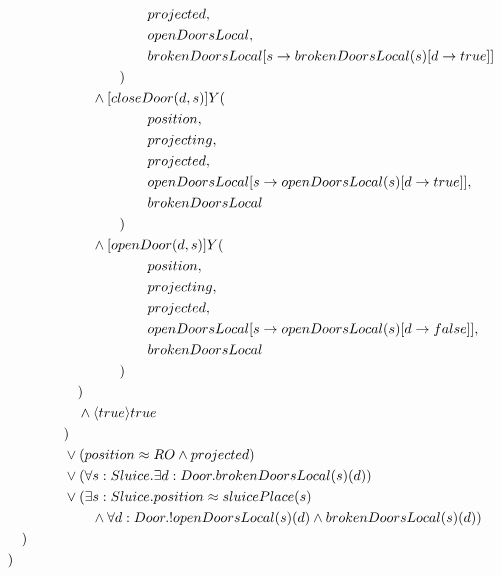 \begin{description}
\begin{align*}
& \tab\tab\tab\tab\tab\tab\tab\tab\tab\tab\tab projected, \\
& \tab\tab\tab\tab\tab\tab\tab\tab\tab\tab\tab openDoorsLocal, \\
& \tab\tab\tab\tab\tab\tab\tab\tab\tab\tab\tab brokenDoorsLocal[s \to brokenDoorsLocal(s)[d \to true]] \\
& \tab\tab\tab\tab\tab\tab\tab\tab\tab ) \\
& \tab\tab\tab\tab\tab\tab\tab  \wedge [closeDoor(d, s)]Y( \\
& \tab\tab\tab\tab\tab\tab\tab\tab\tab\tab\tab position, \\
& \tab\tab\tab\tab\tab\tab\tab\tab\tab\tab\tab projecting, \\
& \tab\tab\tab\tab\tab\tab\tab\tab\tab\tab\tab projected, \\
& \tab\tab\tab\tab\tab\tab\tab\tab\tab\tab\tab openDoorsLocal[s \to openDoorsLocal(s)[d \to true]], \\
& \tab\tab\tab\tab\tab\tab\tab\tab\tab\tab\tab brokenDoorsLocal \\
& \tab\tab\tab\tab\tab\tab\tab\tab\tab ) \\
& \tab\tab\tab\tab\tab\tab\tab \wedge [openDoor(d, s)]Y( \\
& \tab\tab\tab\tab\tab\tab\tab\tab\tab\tab\tab position, \\
& \tab\tab\tab\tab\tab\tab\tab\tab\tab\tab\tab projecting, \\
& \tab\tab\tab\tab\tab\tab\tab\tab\tab\tab\tab projected, \\
& \tab\tab\tab\tab\tab\tab\tab\tab\tab\tab\tab openDoorsLocal[s \to openDoorsLocal(s)[d \to false]], \\
& \tab\tab\tab\tab\tab\tab\tab\tab\tab\tab\tab brokenDoorsLocal \\
& \tab\tab\tab\tab\tab\tab\tab\tab\tab ) \\
& \tab\tab\tab\tab\tab\tab ) \\
& \tab\tab\tab\tab\tab\tab \wedge \langle true \rangle true \\
& \tab\tab\tab\tab\tab ) \\
& \tab\tab\tab\tab\tab \vee (position \approx RO \wedge projected) \\
& \tab\tab\tab\tab\tab \vee (\forall s: Sluice . \exists d: Door . brokenDoorsLocal(s)(d)) \\
& \tab\tab\tab\tab\tab \vee (\exists s: Sluice . position \approx sluicePlace(s) \\
& \tab\tab\tab\tab\tab\tab\tab \wedge \forall d: Door . !openDoorsLocal(s)(d) \wedge brokenDoorsLocal(s)(d)) \\
& \tab\tab ) \\
& \tab ) \\
\end{align*}


\end{description}
